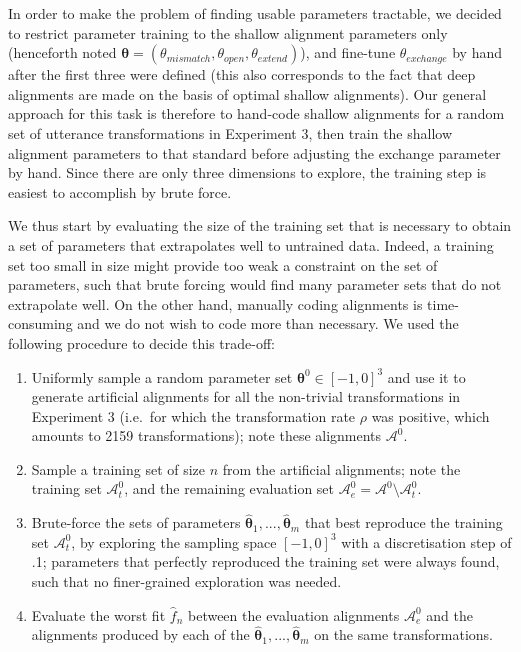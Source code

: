 In order to make the problem of finding usable parameters tractable, we
decided to restrict parameter training to the shallow alignment
parameters only (henceforth noted
\(\bm{\theta} = (\theta_{mismatch}, \theta_{open}, \theta_{extend})\)),
and fine-tune \(\theta_{exchange}\) by hand after the first three were
defined (this also corresponds to the fact that deep alignments are made
on the basis of optimal shallow alignments). Our general approach for
this task is therefore to hand-code shallow alignments for a random set
of utterance transformations in Experiment 3, then train the shallow
alignment parameters to that standard before adjusting the exchange
parameter by hand. Since there are only three dimensions to explore, the
training step is easiest to accomplish by brute force.

We thus start by evaluating the size of the training set that is
necessary to obtain a set of parameters that extrapolates well to
untrained data. Indeed, a training set too small in size might provide
too weak a constraint on the set of parameters, such that brute forcing
would find many parameter sets that do not extrapolate well. On the
other hand, manually coding alignments is time-consuming and we do not
wish to code more than necessary. We used the following procedure to
decide this trade-off:

\begin{enumerate}
\def\labelenumi{\arabic{enumi}.}
\item
  Uniformly sample a random parameter set
  \(\bm{\theta}^0 \in [-1, 0]^3\) and use it to generate artificial
  alignments for all the non-trivial transformations in Experiment 3
  (i.e.~for which the transformation rate \(\rho\) was positive, which
  amounts to 2159 transformations); note these alignments
  \(\mathcal{A}^0\).
\item
  Sample a training set of size \(n\) from the artificial alignments;
  note the training set \(\mathcal{A}_t^0\), and the remaining
  evaluation set
  \(\mathcal{A}_e^0 = \mathcal{A}^0 \setminus \mathcal{A}_t^0\).
\item
  Brute-force the sets of parameters
  \(\hat{\bm{\theta}}_1, ..., \hat{\bm{\theta}}_m\) that best reproduce
  the training set \(\mathcal{A}_t^0\), by exploring the sampling space
  \([-1, 0]^3\) with a discretisation step of .1; parameters that
  perfectly reproduced the training set were always found, such that no
  finer-grained exploration was needed.
\item
  Evaluate the worst fit \(\hat{f}_n\) between the evaluation alignments
  \(\mathcal{A}_e^0\) and the alignments produced by each of the
  \(\hat{\bm{\theta}}_1, ..., \hat{\bm{\theta}}_m\) on the same
  transformations.
\end{enumerate}

